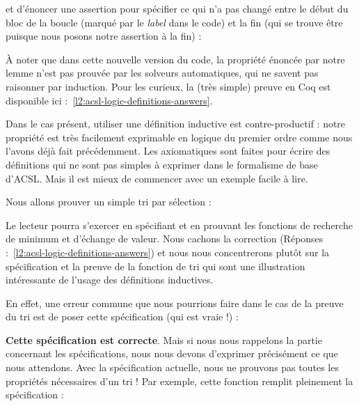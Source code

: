 


et d'énoncer une assertion pour spécifier ce qui n'a pas changé entre le début
du bloc de la boucle (marqué par le \textit{label}  dans le code)
et la fin (qui se trouve être  puisque nous posons notre
assertion à la fin) :






À noter que dans cette nouvelle version du code, la propriété énoncée par notre
lemme n'est pas prouvée par les solveurs automatiques, qui ne savent pas raisonner
par induction. Pour les curieux, la (très simple) preuve en Coq est disponible
ici :~\ref{l2:acsl-logic-definitions-answers}.



Dans le cas présent, utiliser une définition inductive est contre-productif :
notre propriété est très facilement exprimable en logique du premier ordre comme
nous l'avons déjà fait précédemment. Les axiomatiques sont faites pour écrire
des définitions qui ne sont pas simples à exprimer dans le formalisme de base
d'ACSL. Mais il est mieux de commencer avec un exemple facile à lire.




\label{l3:acsl-logic-definitions-inductive-sort}




Nous allons prouver un simple tri par sélection :





Le lecteur pourra s'exercer en spécifiant et en prouvant les fonctions de
recherche de minimum et d'échange de valeur. Nous cachons la correction
(Réponses :~\ref{l2:acsl-logic-definitions-answers}) et nous nous concentrerons
plutôt sur la spécification et la preuve de la fonction de tri qui sont une
illustration intéressante de l'usage des définitions inductives.


En effet, une erreur commune que nous pourrions faire dans le cas de la preuve
du tri est de poser cette spécification (qui est vraie !) :






\textbf{Cette spécification est correcte}. Mais si nous nous rappelons la
partie concernant les spécifications, nous nous devons d'exprimer précisément ce
que nous attendons. Avec la spécification actuelle, nous ne prouvons pas toutes
les propriétés nécessaires d'un tri ! Par exemple, cette fonction remplit
pleinement la spécification :



